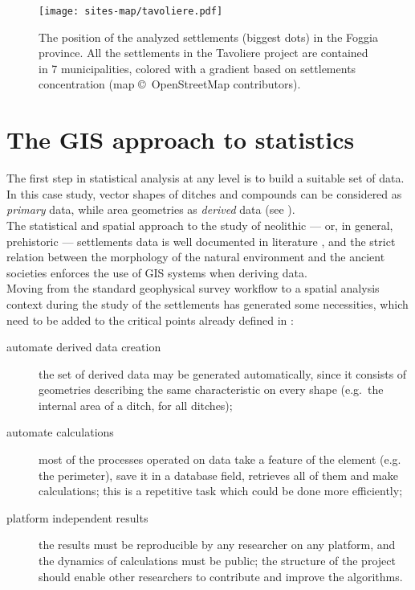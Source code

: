             \begin{figure}[H]
                \texttt{[image: sites-map/tavoliere.pdf]}
                \caption[Analyzed settlments positions in Foggia province]{The position of the analyzed settlements (biggest dots) in the Foggia province. All the settlements in the Tavoliere project are contained in 7 municipalities, colored with a gradient based on settlements concentration (map \copyright~OpenStreetMap contributors).}
                \label{fig:sites-map}
            \end{figure}


    \section{The GIS approach to statistics}
        The first step in statistical analysis at any level is to build a suitable set of data. In this case study, vector shapes of ditches and compounds can be considered as \emph{primary} data, while area geometries as \emph{derived} data (see ).\\
        The statistical and spatial approach to the study of neolithic --- or, in general, prehistoric --- settlements data is well documented in literature \cite{arch-location-model}, and the strict relation between the morphology of the natural environment and the ancient societies enforces the use of GIS systems when deriving data.\\
        Moving from the standard geophysical survey workflow to a spatial analysis context during the study of the settlements has generated some necessities, which need to be added to the critical points already defined in :

        \begin{description}
            \item[automate derived data creation] the set of derived data may be generated automatically, since it consists of geometries describing the same characteristic on every shape (e.g.\ the internal area of a ditch, for all ditches);
            \item[automate calculations] most of the processes operated on data take a feature of the element (e.g. the perimeter), save it in a database field, retrieves all of them and make calculations; this is a repetitive task which could be done more efficiently;
            \item[platform independent results] the results must be reproducible by any researcher on any platform, and the dynamics of calculations must be public; the structure of the project should enable other researchers to contribute and improve the algorithms.
        \end{description}


